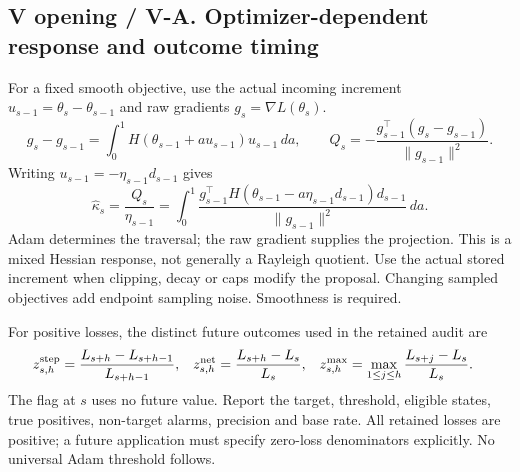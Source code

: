 \subsection*{V opening / V-A. Optimizer-dependent response and outcome timing}
For a fixed smooth objective, use the actual incoming increment
$u_{s-1}=\theta_s-\theta_{s-1}$ and raw gradients $g_s=\nabla L(\theta_s)$.
\begin{equation}
g_s-g_{s-1}
=\int_0^1H(\theta_{s-1}+a u_{s-1})u_{s-1}\,da,\qquad
Q_s=-\frac{g_{s-1}^\top(g_s-g_{s-1})}{\|g_{s-1}\|^2}.
\label{consol:adam-response}
\end{equation}
Writing $u_{s-1}=-\eta_{s-1}d_{s-1}$ gives
\begin{equation}
\widehat\kappa_s=\frac{Q_s}{\eta_{s-1}}
=\int_0^1
\frac{g_{s-1}^\top H(\theta_{s-1}-a\eta_{s-1}d_{s-1})d_{s-1}}
{\|g_{s-1}\|^2}\,da .
\label{consol:mixed-projection}
\end{equation}
Adam determines the traversal; the raw gradient supplies the projection.
This is a mixed Hessian response, not generally a Rayleigh quotient.
Use the actual stored increment when clipping, decay or caps modify the proposal.
Changing sampled objectives add endpoint sampling noise. Smoothness is required.

For positive losses, the distinct future outcomes used in the retained audit are
\begin{align}
z_{s,h}^{\rm step}&=\frac{L_{s+h}-L_{s+h-1}}{L_{s+h-1}},&
z_{s,h}^{\rm net}&=\frac{L_{s+h}-L_s}{L_s},&
z_{s,h}^{\rm max}&=\max_{1\leq j\leq h}\frac{L_{s+j}-L_s}{L_s}.
\label{consol:future-targets}
\end{align}
The flag at $s$ uses no future value. Report the target, threshold, eligible
states, true positives, non-target alarms, precision and base rate.
All retained losses are positive; a future application must specify
zero-loss denominators explicitly. No universal Adam threshold follows.
